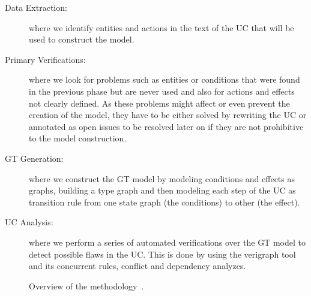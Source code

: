 \begin{description}
  \item[Data Extraction:] where we identify entities and actions in the text of the UC that will be used to construct the model.
  \item[Primary Verifications:] where we look for problems such as entities or conditions that were found in the previous phase but are never used and also for actions and effects not clearly defined. As these problems might affect or even prevent the creation of the model, they have to be either solved by rewriting the UC or annotated as open issues to be resolved later on if they are not prohibitive to the model construction.
  \item[GT Generation:] where we construct the GT model by modeling conditions and effects as graphs, building a type graph and then modeling each step of the UC as transition rule from one state graph (the conditions) to other (the effect).
  \item[UC Analysis:] where we perform a series of automated verifications over the GT model to detect possible flaws in the UC. This is done by using the verigraph tool  and its concurrent rules, conflict and dependency analyzes.
\end{description}

\begin{figure}[!ht]
  \centering
  \caption{Overview of the methodology~\cite{Junior2015}.}\label{fig:tests:methodology}
\end{figure}

